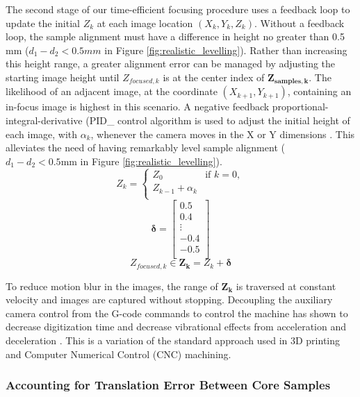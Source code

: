\documentclass[a4paper,12pt]{article}
\begin{document}
The second stage of our time-efficient focusing procedure uses a feedback loop to update the initial $Z_k$ at each image location $(X_k, Y_k, Z_k)$. 
Without a feedback loop, the sample alignment must have a difference in height no greater than 0.5 mm ($d_1 - d_2 < 0.5 mm $ in Figure \ref{fig:realistic_levelling}). 
Rather than increasing this height range, a greater alignment error can be managed by adjusting the starting image height until $Z_{focused,k}$ is at the center index of $\boldsymbol{Z_{samples,k}}$. 
The likelihood of an adjacent image, at the coordinate $(X_{k+1}, Y_{k+1})$, containing an in-focus image is highest in this scenario. 
A negative feedback  %
proportional-integral-derivative (PID_ control algorithm is used to adjust the initial height of each image, with $\alpha_k$, whenever the camera moves in the X or Y dimensions \citep{odwyer_summary_2000}. 
This alleviates the need of having remarkably level sample alignment ($d_1 - d_2 < 0.5\text{mm}$ in Figure \ref{fig:realistic_levelling}). %
\[
Z_k = \begin{cases}
  Z_0 & \text{if } k = 0,\\
  Z_{k-1} + \alpha_k \\
  \end{cases}
\]
\[\boldsymbol{\delta} = 
\begin{bmatrix}
  0.5 \\
  0.4 \\
  \vdots \\
  -0.4 \\
  -0.5 \\
  \end{bmatrix}\]
\[
Z_{focused,k} \in
\boldsymbol{Z_k} = 
Z_k + \boldsymbol{\delta}
\] 

To reduce motion blur in the images, the range of $\boldsymbol{Z_k}$ is traversed at constant velocity and images are captured without stopping. 
Decoupling the auxiliary camera control from the G-code commands to control the machine has shown to decrease digitization time and decrease vibrational effects from acceleration and deceleration \citep{propst_time_2025}.
This is a variation of the standard approach used in 3D printing and Computer Numerical Control (CNC) machining. 
  
\subsubsection{Accounting for Translation Error Between Core Samples}
\end{document}
